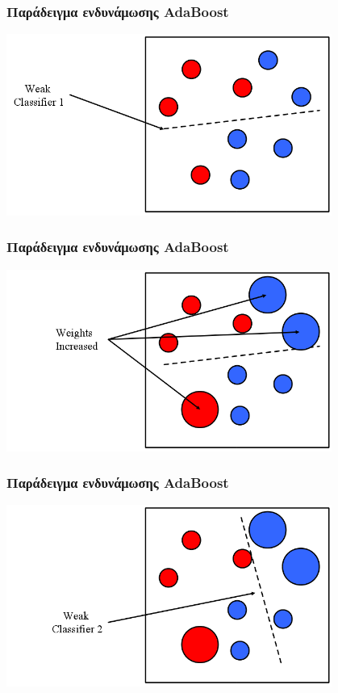 \documentclass{beamer}
\begin{document}
\begin{frame}
\frametitle{Παράδειγμα ενδυνάμωσης AdaBoost}
\begin{center}
\includegraphics[width=0.8\textwidth]{images/boosting/boosting-1}
\end{center}
\end{frame}

\begin{frame}
\frametitle{Παράδειγμα ενδυνάμωσης AdaBoost}
\begin{center}
\includegraphics[width=0.8\textwidth]{images/boosting/boosting-2}
\end{center}
\end{frame}

\begin{frame}
\frametitle{Παράδειγμα ενδυνάμωσης AdaBoost}
\begin{center}
\includegraphics[width=0.8\textwidth]{images/boosting/boosting-3}
\end{center}
\end{frame}
\end{document}
